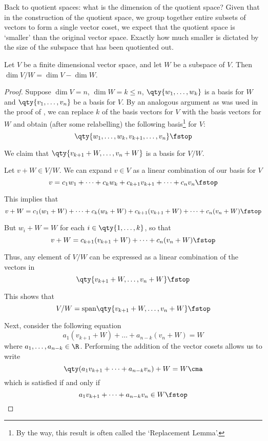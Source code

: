  Back to quotient spaces: what is the dimension of the quotient space? Given that in the construction of the quotient space, we group together entire subsets of vectors to form a single vector coset, we expect that the quotient space is `smaller' than the original vector space. Exactly how much smaller is dictated by the size of the subspace that has been quotiented out.
 \begin{proposition}
   \label{thm:codim}
   Let \( V \) be a finite dimensional vector space, and let \( W \) be a subspace of \( V \). Then \( \dim V/W=\dim V-\dim W \).
 \end{proposition}
 \begin{proof}
   Suppose \( \dim V=n \), \( \dim W=k\leq n \), \( \qty{w_1,\dots, w_k} \) is a basis for \( W \) and \( \qty{v_1,\dots, v_n} \) be a basis for \( V \). By an analogous argument as was used in the proof of , we can replace \( k \) of the basis vectors for \( V \) with the basis vectors for \( W \) and obtain (after some relabelling) the following basis\footnote{By the way, this result is often called the `Replacement Lemma'.} for \( V \):
   \[ \qty{w_1,\dots,w_k,v_{k+1},\dots,v_n}\fstop \]

   We claim that \( \qty{v_{k+1}+W,\dots,v_n+W} \) is a basis for \( V/W \).

   \vspace{3mm}

   Let \( v+W\in V/W \). We can expand \( v\in V \) as a linear combination of our basis for \( V \)
   \[ v=c_1w_1+\dots+c_kw_k+c_{k+1}v_{k+1}+\dots+c_nv_n\fstop \]

   This implies that
   \[ v+W=c_1(w_1+W)+\dots+c_k(w_k+W)+c_{k+1}(v_{k+1}+W)+\dots+c_n(v_n+W)\fstop \]

   But \( w_i+W=W \) for each \( i\in\qty{1,\dots,k} \), so that
   \[ v+W=c_{k+1}(v_{k+1}+W)+\dots+c_n(v_n+W)\fstop \]

   Thus, any element of \( V/W \) can be expressed as a linear combination of the vectors in
   \[ \qty{v_{k+1}+W,\dots,v_n+W} \fstop \]

   This shows that
   \[ V/W=\text{span}\qty{v_{k+1}+W,\dots,v_n+W}\fstop \]

   Next, consider the following equation
   \[ a_1(v_{k+1}+W)+\dots+a_{n-k}(v_n+W)=W \]
   where \( a_1,\dots,a_{n-k}\in \R \). Performing the addition of the vector cosets allows us to write
   \[ \qty(a_1v_{k+1}+\dots+a_{n-k}v_n)+W=W\cma \]
   which is satisfied if and only if
   \[ a_1v_{k+1}+\dots+a_{n-k}v_n\in W\fstop \]


\end{proof}
